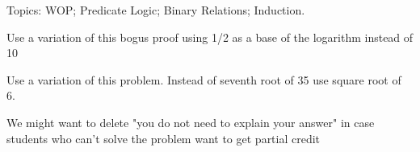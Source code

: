 \documentclass[quiz]{mcs}
\begin{document}

\begin{staffnotes}
Topics: WOP; Predicate Logic; Binary Relations; Induction.
\end{staffnotes}


Use a variation of this bogus proof using 1/2 as a base of the logarithm instead of 10
\examspace

Use a variation of this problem. Instead of seventh root of 35 use square root of 6.

\examspace
We might want to delete "you do not need to explain your answer" in case students who can't solve the problem want to get partial credit

\examspace


\examspace
{}










\end{document}
